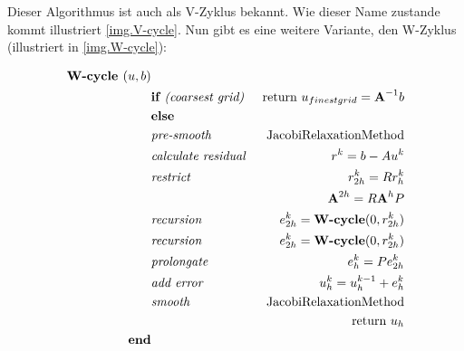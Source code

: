 \label{img.V-cycle}

Dieser Algorithmus ist auch als V-Zyklus bekannt. Wie dieser Name zustande kommt illustriert \autoref{img.V-cycle}. Nun gibt es eine weitere Variante, den W-Zyklus (illustriert in \autoref{img.W-cycle}):

\begin{eqnarray}
\textbf{W-cycle }(u,b)                         & \notag \\
&\textbf{if }\textit{(coarsest grid) }&\textnormal{return } u_{finest grid}={\textbf{A}}^{-1}b \notag \\
&\textbf{else }                                                & \notag \\
&\textit{pre-smooth }                                 &\textnormal{JacobiRelaxationMethod} \notag \\
&\textit{calculate residual }                &r^{k} = b - Au^{k} \notag \\
&\textit{restrict }                                 &r^{k}_{2h}=Rr^{k}_{h} \notag \\
&                                                                        &{\textbf{A}}^{2h} = R{\textbf{A}}^{h}P \notag \\
&\textit{recursion }                                &e^{k}_{2h} = \textbf{W-cycle}(0,r^{k}_{2h}) \notag \\
&\textit{recursion }                                &e^{k}_{2h} = \textbf{W-cycle}(0,r^{k}_{2h}) \notag \\
&\textit{prolongate }                                &e^{k}_{h} = Pe^{k}_{2h} \notag \\
&\textit{add error }                                &u^{k}_{h} = u^{k-1}_{h} + e^{k}_{h} \notag \\
&\textit{smooth }                                        &\textnormal{JacobiRelaxationMethod} \notag \\
&                                                                        &\textnormal{return } u_{h} \notag \\
\textbf{end}                                                & \notag
\end{eqnarray}

\label{img.W-cycle}


